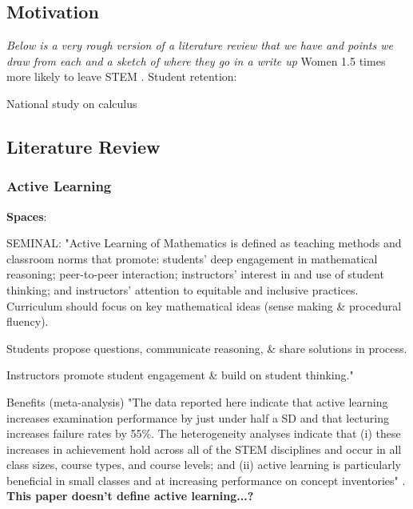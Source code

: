 \documentclass{LSRIarticle}
\begin{document}

\subsection{Motivation}
\textit{Below is a very rough version of a literature review that we have and points we draw from each and a sketch of where they go in a write up}
Women 1.5 times more likely to leave STEM \parencite{ellisWomenTimesMore2016}.
Student retention: \parencite{dewitzCollegeStudentRetention2009}

National study on calculus \parencite{bressoudInsightsRecommendationsMAA}

\subsection{Literature Review}

\subsubsection{Active Learning}
\textbf{Spaces}: \parencite{parkTransformationClassroomSpaces2014, brooksSpaceConsequencesImpact2012, cotnerItNotYou2013}

SEMINAL: "Active Learning of Mathematics is defined as teaching methods and classroom norms that promote:
students’ deep engagement in mathematical reasoning;
peer-to-peer interaction; 
instructors' interest in and use of student thinking; and
instructors' attention to equitable and inclusive practices.
Curriculum should focus on key mathematical ideas (sense making & procedural fluency).

Students propose questions, communicate reasoning, & share solutions in process.

Instructors promote student engagement & build on student thinking." \parencite{laursenPrizeInquiryApproaches2019a}


Benefits (meta-analysis) "The data reported here indicate that active learning increases examination performance by just under half a SD and that lecturing increases failure rates by 55\%. The heterogeneity analyses indicate that (i) these increases in achievement hold across all of the STEM disciplines and occur in all class sizes, course types, and course levels; and (ii) active learning is particularly beneficial in small classes and at increasing performance on concept inventories" \parencite{freemanActiveLearningIncreases2014}. \textbf{This paper doesn't define active learning...?}
\end{document}
